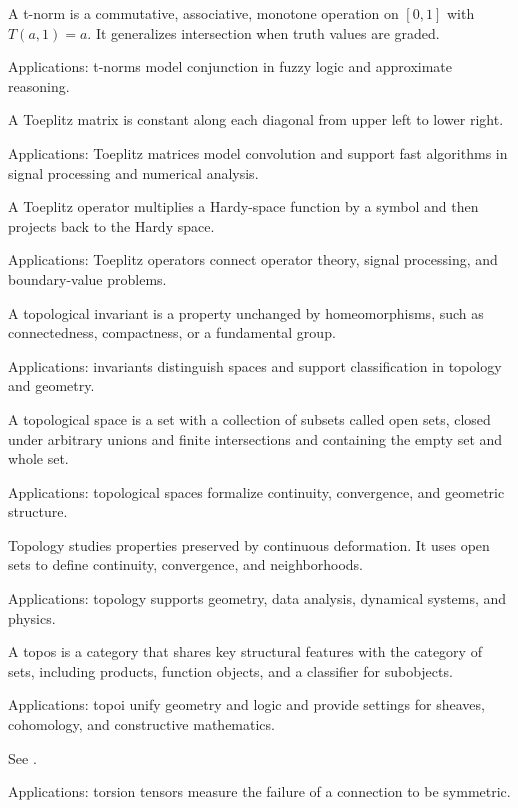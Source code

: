 A t-norm is a commutative, associative, monotone operation on $[0,1]$ with $T(a,1)=a$. It generalizes intersection when truth values are graded. \par\noindent Applications: t-norms model conjunction in fuzzy logic and approximate reasoning.

A Toeplitz matrix is constant along each diagonal from upper left to lower right. \par\noindent Applications: Toeplitz matrices model convolution and support fast algorithms in signal processing and numerical analysis.

A Toeplitz operator multiplies a Hardy-space function by a symbol and then projects back to the Hardy space. \par\noindent Applications: Toeplitz operators connect operator theory, signal processing, and boundary-value problems.

A topological invariant is a property unchanged by homeomorphisms, such as connectedness, compactness, or a fundamental group. \par\noindent Applications: invariants distinguish spaces and support classification in topology and geometry.

A topological space is a set with a collection of subsets called open sets, closed under arbitrary unions and finite intersections and containing the empty set and whole set. \par\noindent Applications: topological spaces formalize continuity, convergence, and geometric structure.

Topology studies properties preserved by continuous deformation. It uses open sets to define continuity, convergence, and neighborhoods. \par\noindent Applications: topology supports geometry, data analysis, dynamical systems, and physics.

A topos is a category that shares key structural features with the category of sets, including products, function objects, and a classifier for subobjects. \par\noindent Applications: topoi unify geometry and logic and provide settings for sheaves, cohomology, and constructive mathematics.

See . \par\noindent Applications: torsion tensors measure the failure of a connection to be symmetric.

